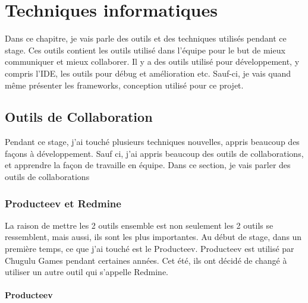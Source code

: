 \chapter{Techniques informatiques} %
\label{cha:techniques_informatiques}

Dans ce chapitre, je vais parle des outils et des techniques utilisés pendant ce stage. Ces outils contient les outils utilisé dans l'équipe pour le but de mieux communiquer et mieux collaborer. Il y a des outils utilisé pour développement, y compris l'IDE, les outils pour débug et amélioration etc. Sauf-ci, je vais quand même présenter les frameworks, conception utilisé pour ce projet.

\section{Outils de Collaboration} %
\label{sec:outils_de_collaboration}

Pendant ce stage, j'ai touché plusieurs techniques nouvelles, appris beaucoup des façons à développement. Sauf ci, j'ai appris beaucoup des outils de collaborations, et apprendre la façon de travaille en équipe. Dans ce section, je vais parler des outils de collaborations

\subsection{Producteev et Redmine} %
\label{ssub:producteev_et_redmine}

La raison de mettre les 2 outils ensemble est non seulement les 2 outils se ressemblent, mais aussi, ils sont les plus importantes. Au début de stage, dans un première temps, ce que j'ai touché est le Producteev. Producteev est utilisé par Chugulu Games pendant certaines années. Cet été, ils ont décidé de changé à utiliser un autre outil qui s'appelle Redmine. 

\subsubsection{Producteev} %
\label{ssub:producteev}


